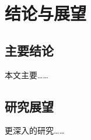 \cleardoublepage



\section{结论与展望}

\subsection{主要结论}
本文主要……

\subsection{研究展望}
更深入的研究…… \cite{yang1999}